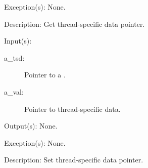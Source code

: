 \begin{capi}
\begin{capilist}
\begin{description}
		\end{description}
	\item[Exception(s): ] None.
	\item[Description: ]
		Get thread-specific data pointer.
	\end{capilist}
\label{tsd_set}
	\begin{capilist}
	\item[Input(s): ]
		\begin{description}\item[]
		\item[a\_tsd: ]
			Pointer to a .
		\item[a\_val: ]
			Pointer to thread-specific data.
		\end{description}
	\item[Output(s): ] None.
	\item[Exception(s): ] None.
	\item[Description: ]
		Set thread-specific data pointer.
	\end{capilist}
\end{capi}
